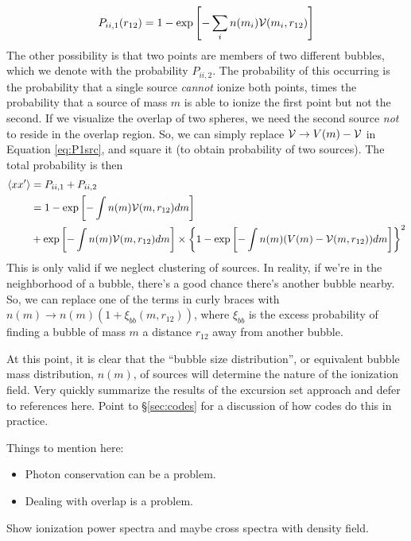 \begin{equation}
    P_{ii,1} (r_{12}) = 1 - \exp \left[ -\sum_i n(m_i) \mathcal{V}(m_i,r_{12}) \right]
\end{equation}
The other possibility is that two points are members of two different bubbles, which we denote with the probability $P_{ii,2}$. The probability of this occurring is the probability that a single source \textit{cannot} ionize both points, times the probability that a source of mass $m$ is able to ionize the first point but not the second. If we visualize the overlap of two spheres, we need the second source \textit{not} to reside in the overlap region. So, we can simply replace $\mathcal{V} \rightarrow V(m) - \mathcal{V}$ in Equation \ref{eq:P1src}, and square it (to obtain probability of two sources). The total probability is then
\begin{align}
    \langle x x^{\prime} \rangle & = P_{ii,1} + P_{ii,2} \nonumber \\
    & = 1 - \exp \left[- \int n(m) \mathcal{V}(m,r_{12}) dm \right] \nonumber \\
    & + \exp \left[- \int n(m) \mathcal{V}(m,r_{12}) dm \right] \times \left\{1 - \exp \left[- \int n(m) (V(m) - \mathcal{V}(m,r_{12})) dm \right] \right\}^2
\end{align}
This is only valid if we neglect clustering of sources. In reality, if we're in the neighborhood of a bubble, there's a good chance there's another bubble nearby. So, we can replace one of the terms in curly braces with $n(m) \rightarrow n(m) (1 + \xi_{bb}(m, r_{12}))$, where $\xi_{bb}$ is the excess probability of finding a bubble of mass $m$ a distance $r_{12}$ away from another bubble. 

At this point, it is clear that the ``bubble size distribution'', or equivalent bubble mass distribution, $n(m)$, of sources will determine the nature of the ionization field. {\color{red} Very quickly summarize the results of the excursion set approach and defer to references here. Point to \S\ref{sec:codes} for a discussion of how codes do this in practice.}

{\color{red} Things to mention here:
\begin{itemize}
	\item Photon conservation can be a problem.
	\item Dealing with overlap is a problem.
\end{itemize}}

{\color{red} Show ionization power spectra and maybe cross spectra with density field.}


